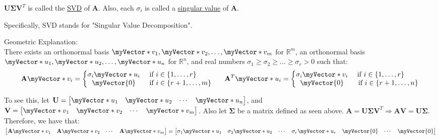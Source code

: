 \documentclass{book}
\newcommand{\myComment}{%
   \color{RawerSienna}%
   \fontsize{12}{14}\selectfont%
}
\newcommand{\teachComment}{
   \color{Orange}%
   \fontsize{12}{14}\selectfont%
}
\newenvironment{myDindent}{%
   \begin{adjustwidth}{5.0em}{0em}%
}{%
   \end{adjustwidth}%
}
\newenvironment{myTindent}{%
   \begin{adjustwidth}{7.5em}{0em}%
}{%
   \end{adjustwidth}%
}
\newcommand{\udefine}[1]{%
   {\setulcolor{Red}%
   \setul{0.14em}{0.07em}%
   \ul{#1}}%
}
\newcommand{\retTwo}{\hfill\bigbreak}
\newcommand{\mVec}[1]{\myVector{#1}}
\newcommand{\mVecAst}[1]{\myVector*{#1}}
\newcommand{\mMat}[1]{\mathbf{#1}}
\begin{document}
   $\mMat{U}\bm{\Sigma}\mMat{V}^T$ is called the \udefine{SVD} of $\mMat{A}$. Also, each $\sigma_i$ is called a \udefine{singular value} of $\mMat{A}$.
   {\begin{myTindent} \myComment
      Specifically, SVD stands for "Singular Value Decomposition". \retTwo
   \end{myTindent}}
   
   {\begin{myDindent} \teachComment
      Geometric Explanation:\\
      There exists an orthonormal basis $\mVecAst{v}_1, \mVecAst{v}_2, \ldots, \mVecAst{v}_m$ for $\mathbb{R}^m$, an orthonormal basis $\mVecAst{u}_1, \mVecAst{u}_2, \ldots, \mVecAst{u}_n$ for $\mathbb{R}^n$, and real numbers $\sigma_1 \geq \sigma_2 \geq \ldots \geq \sigma_r > 0$ such that:
      \[\mMat{A}\mVecAst{v}_i = \left\{
      \begin{matrix}
         \sigma_i\mVecAst{u}_i & \text{ if } i \in \{1,\ldots,r\} \phantom{aaaa} \\
         \mVec{0} & \text{ if } i \in \{r+1,\ldots,m\}
      \end{matrix}\right. \phantom{aaa}
      \mMat{A}^T\mVecAst{u}_i = \left\{
         \begin{matrix}
            \sigma_i\mVecAst{v}_i & \text{ if } i \in \{1,\ldots,r\} \phantom{aaaa} \\
            \mVec{0} & \text{ if } i \in \{r+1,\ldots,n\}
         \end{matrix}\right.\]
      \retTwo
      \retTwo
      
      To see this, let $\mMat{U} = \left[
      \begin{matrix}
         \mVecAst{u}_1 & \mVecAst{u}_2 & \cdots & \mVecAst{u}_n
      \end{matrix}\right]$, and $\mMat{V} = \left[
      \begin{matrix}
         \mVecAst{v}_1 & \mVecAst{v}_2 & \cdots & \mVecAst{v}_m
      \end{matrix}\right]$. Also let $\bm{\Sigma}$ be a matrix defined as seen above. \retTwo 
      $\mMat{A} = \mMat{U}\bm{\Sigma}\mMat{V}^T \Longrightarrow \mMat{A}\mMat{V} = \mMat{U}\bm{\Sigma}$. Therefore, we have that:\\ 
      $\left[\begin{matrix}
         \mMat{A}\mVecAst{v}_1 & \mMat{A}\mVecAst{v}_2 & \cdots & \mMat{A}\mVecAst{v}_m
      \end{matrix}\right] = \left[\begin{matrix}
         \sigma_1\mVecAst{u}_1 & \sigma_2\mVecAst{u}_2 & \cdots & \sigma_r\mVecAst{u}_r & \mVec{0} & \cdots & \mVec{0} 
      \end{matrix}\right]$ \retTwo


\end{myDindent}}
\end{document}
